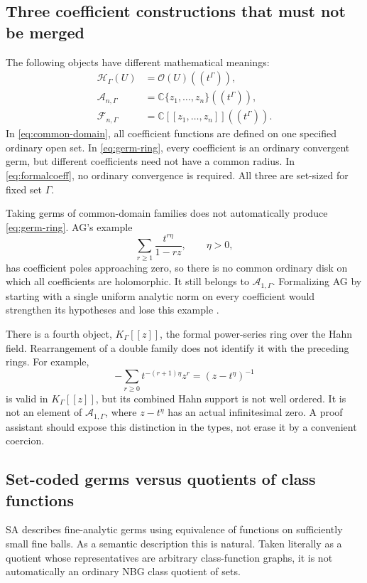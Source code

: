 \documentclass[11pt,letterpaper]{article}
\theoremstyle{definition}
\theoremstyle{remark}
\newcommand{\C}{\mathbb C}
\newcommand{\A}{\mathscr A}
\numberwithin{equation}{section}
\begin{document}
\subsection{Three coefficient constructions that must not be merged}
The following objects have different mathematical meanings:
\begin{align}
 \mathcal H_\Gamma(U)&=\mathcal O(U)((t^\Gamma)),\label{eq:common-domain}\\
 \A_{n,\Gamma}&=\C\{z_1,\ldots,z_n\}((t^\Gamma)),\label{eq:germ-ring}\\
 \mathscr F_{n,\Gamma}&=\C[[z_1,\ldots,z_n]]((t^\Gamma)).\label{eq:formalcoeff}
\end{align}
In \eqref{eq:common-domain}, all coefficient functions are defined on one specified ordinary open set. In \eqref{eq:germ-ring}, every coefficient is an ordinary convergent germ, but different coefficients need not have a common radius. In \eqref{eq:formalcoeff}, no ordinary convergence is required. All three are set-sized for fixed set \(\Gamma\).

Taking germs of common-domain families does not automatically produce \eqref{eq:germ-ring}. AG's example
\[
 \sum_{r\ge1}\frac{t^{r\eta}}{1-rz},\qquad \eta>0,
\]
has coefficient poles approaching zero, so there is no common ordinary disk on which all coefficients are holomorphic. It still belongs to \(\A_{1,\Gamma}\). Formalizing AG by starting with a single uniform analytic norm on every coefficient would strengthen its hypotheses and lose this example \cite[\S3]{AG}.

There is a fourth object, \(K_\Gamma[[z]]\), the formal power-series ring over the Hahn field. Rearrangement of a double family does not identify it with the preceding rings. For example,
\[
 -\sum_{r\ge0}t^{-(r+1)\eta}z^r=(z-t^\eta)^{-1}
\]
is valid in \(K_\Gamma[[z]]\), but its combined Hahn support is not well ordered. It is not an element of \(\A_{1,\Gamma}\), where \(z-t^\eta\) has an actual infinitesimal zero. A proof assistant should expose this distinction in the types, not erase it by a convenient coercion.

\subsection{Set-coded germs versus quotients of class functions}
SA describes fine-analytic germs using equivalence of functions on sufficiently small fine balls. As a semantic description this is natural. Taken literally as a quotient whose representatives are arbitrary class-function graphs, it is not automatically an ordinary NBG class quotient of sets.
\end{document}
